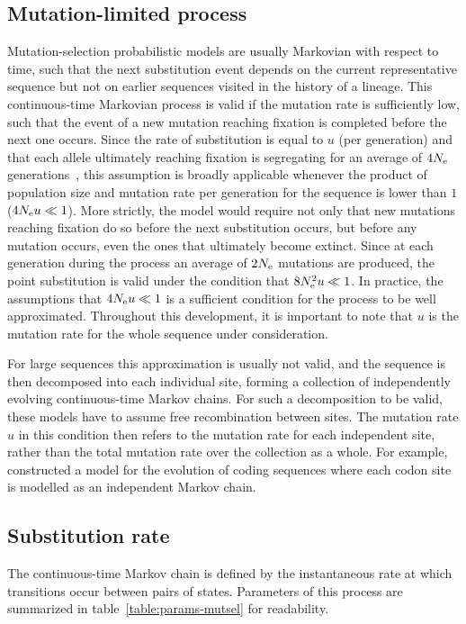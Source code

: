 \subsection{Mutation-limited process}
\label{subsec:mutation-limited-assumption}

Mutation-selection probabilistic models are usually Markovian with respect to time, such that the next substitution event depends on the current representative sequence but not on earlier sequences visited in the history of a lineage.
This continuous-time Markovian process is valid if the mutation rate is sufficiently low, such that the event of a new mutation reaching fixation is completed before the next one occurs.
Since the rate of substitution is equal to $u$ (per generation) and that each allele ultimately reaching fixation is segregating for an average of $4 N_{\text{e}}$ generations~\citep{Kimura1969}, this assumption is broadly applicable whenever the product of population size and mutation rate per generation for the sequence is lower than $1$ ($4 N_{\text{e}} u \ll 1$).
More strictly, the model would require not only that new mutations reaching fixation do so before the next substitution occurs, but before any mutation occurs, even the ones that ultimately become extinct.
Since at each generation during the process an average of $2N_{\text{e}}$ mutations are produced, the point substitution is valid under the condition that $8N_{\text{e}}^2 u \ll 1$.
In practice, the assumptions that $4 N_{\text{e}} u \ll 1$ is a sufficient condition for the process to be well approximated.
Throughout this development, it is important to note that $u$ is the mutation rate for the whole sequence under consideration.

For large sequences this approximation is usually not valid, and the sequence is then decomposed into each individual site, forming a collection of independently evolving continuous-time Markov chains.
For such a decomposition to be valid, these models have to assume free recombination between sites.
The mutation rate $u$ in this condition then refers to the mutation rate for each independent site, rather than the total mutation rate over the collection as a whole.
For example, \citet{Halpern1998} constructed a model for the evolution of coding sequences where each codon site is modelled as an independent Markov chain.

\subsection{Substitution rate}
The continuous-time Markov chain is defined by the instantaneous rate at which transitions occur between pairs of states.
Parameters of this process are summarized in table~\ref{table:params-mutsel} for readability.

